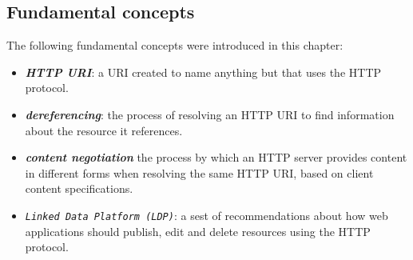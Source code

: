 \hypertarget{fundamental-concepts}{%
\subsection{Fundamental concepts}\label{fundamental-concepts}}

The following fundamental concepts were introduced in this chapter:

\begin{itemize}
\item
  \emph{\textbf{HTTP URI}}: a URI created to name anything but that
  uses the HTTP protocol.
\item
  \emph{\textbf{dereferencing}}: the process of resolving an HTTP URI to find information about 
  the resource it references. 
\item
  \emph{\textbf{content negotiation}} the process by which an HTTP server provides content in different forms when 
  resolving the
  same HTTP URI, based on client content specifications.  

\item 
  \emph{\texttt{Linked Data Platform (LDP)}}: a sest of recommendations about how web applications should 
  publish, edit and delete resources using the HTTP protocol.
\end{itemize}

